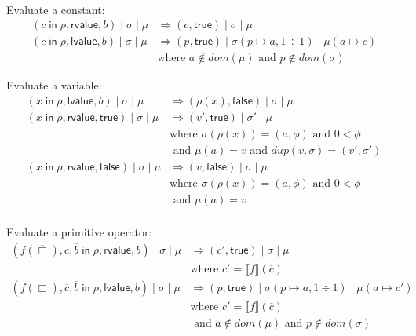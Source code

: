 \documentclass{article}
\newcommand{\IN}{\mathop{\mathsf{in}}}
\begin{document}
\\

Evaluate a constant:
\begin{align*}
  (c \IN \rho,\mathsf{rvalue},b) \mid \sigma \mid \mu  &
     \Rightarrow (c, \mathsf{true}) \mid \sigma \mid \mu \\
  (c \IN \rho,\mathsf{lvalue},b) \mid \sigma \mid \mu &
     \Rightarrow (p, \mathsf{true}) \mid \sigma(p \mapsto a,1 \div 1) \mid \mu(a \mapsto c) \\
     & \text{where } a \notin \mathit{dom}(\mu)
     \text{ and } p \notin \mathit{dom}(\sigma)
\end{align*}

Evaluate a variable:
\begin{align*}
 (x \IN \rho,\mathsf{lvalue}, b) \mid \sigma \mid \mu &
      \Rightarrow (\rho(x), \mathsf{false}) \mid \sigma \mid \mu \\
  (x \IN \rho,\mathsf{rvalue}, \mathsf{true}) \mid \sigma \mid \mu  &
     \Rightarrow (v', \mathsf{true}) \mid \sigma' \mid \mu\\
     & \text{where } \sigma(\rho(x)) = (a, \phi) 
       \text{ and } 0 < \phi \\
     & \text{ and } \mu(a) = v
       \text{ and } \mathit{dup}(v,\sigma) = (v',\sigma') \\
 (x \IN \rho,\mathsf{rvalue}, \mathsf{false}) \mid \sigma \mid \mu &
      \Rightarrow (v, \mathsf{false}) \mid \sigma \mid \mu\\
     & \text{where } \sigma(\rho(x)) = (a, \phi) 
       \text{ and } 0 < \phi \\
     & \text{ and } \mu(a) = v\\[2ex]
\end{align*}

Evaluate a primitive operator:
\begin{align*}
(f(\overline{\Box}), \overline{c}, \overline{b} \IN \rho, \mathsf{rvalue}, b) \mid \sigma \mid \mu &
  \Rightarrow (c', \mathsf{true}) \mid \sigma \mid \mu \\
  & \text{where } c' = \llbracket f \rrbracket (\overline{c}) \\
(f(\overline{\Box}), \overline{c}, \overline{b} \IN \rho,\mathsf{lvalue},b) \mid \sigma \mid \mu &
     \Rightarrow (p, \mathsf{true}) \mid \sigma(p \mapsto a,1 \div 1) \mid \mu(a \mapsto c') \\
     & \text{where } c' = \llbracket f \rrbracket (\overline{c})\\
    & \text{ and } a \notin \mathit{dom}(\mu)
     \text{ and } p \notin \mathit{dom}(\sigma)
\end{align*}
\end{document}
